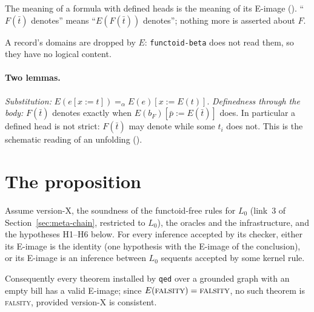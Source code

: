 The meaning of a formula with defined heads is the meaning of its
E-image ().  ``$F(\bar t)$ denotes'' means ``$E(F(\bar t))$
denotes''; nothing more is asserted about $F$.

A record's domains are dropped by $E$: \texttt{functoid-beta} does not
read them, so they have no logical content.

\paragraph{Two lemmas.}  \emph{Substitution:}
$E(e[x:=t]) =_\alpha E(e)[x:=E(t)]$.  \emph{Definedness through the
body:} $F(\bar t)$ denotes exactly when $E(b_F)[\bar p := E(\bar t)]$
does.  In particular a defined head is not strict: $F(\bar t)$ may denote
while some $t_i$ does not.  This is the schematic reading of an unfolding
().

\section{The proposition}

\begin{prop}\label{prop:meta-fun}
Assume version-X, the soundness of the functoid-free rules for $L_0$
(link~3 of Section~\ref{sec:meta-chain}, restricted to $L_0$), the
oracles and the infrastructure, and the hypotheses H1--H6 below.  For
every inference accepted by its checker, either its E-image is the
identity (one hypothesis with the E-image of the conclusion), or its
E-image is an inference between $L_0$ sequents accepted by some kernel
rule.

Consequently every theorem installed by \texttt{qed} over a grounded
graph with an empty bill has a valid E-image; since
$E(\textup{\textsc{falsity}}) = \textup{\textsc{falsity}}$, no such theorem is
\textup{\textsc{falsity}}, provided version-X is consistent.
\end{prop}

